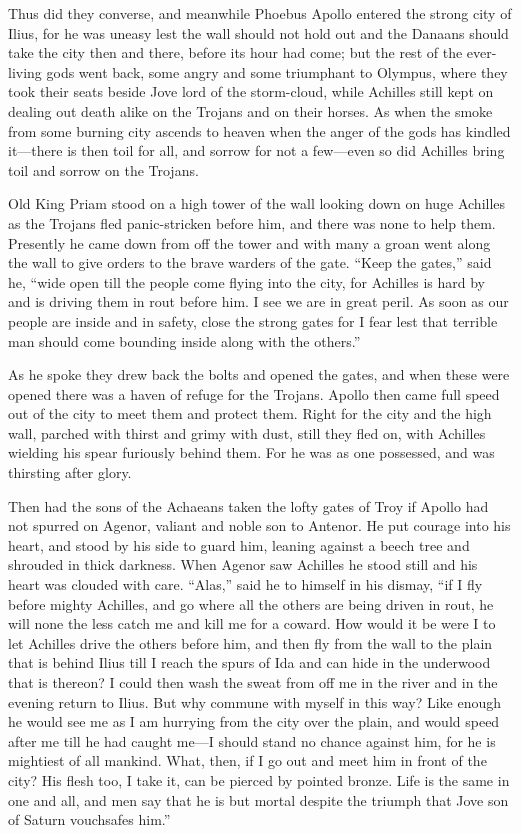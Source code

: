 Thus did they converse, and meanwhile Phoebus Apollo entered the strong
city of Ilius, for he was uneasy lest the wall should not hold out and the
Danaans should take the city then and there, before its hour had come; but
the rest of the ever-living gods went back, some angry and some triumphant
to Olympus, where they took their seats beside Jove lord of the storm-cloud,
while Achilles still kept on dealing out death alike on the Trojans
and on their horses. As when the smoke from some burning city ascends to
heaven when the anger of the gods has kindled it—there is then toil
for all, and sorrow for not a few—even so did Achilles bring toil
and sorrow on the Trojans.

Old King Priam stood on a high tower of the wall looking down on huge
Achilles as the Trojans fled panic-stricken before him, and there was none
to help them. Presently he came down from off the tower and with many a
groan went along the wall to give orders to the brave warders of the gate.
“Keep the gates,” said he, “wide open till the people come flying into the
city, for Achilles is hard by and is driving them in rout before him. I
see we are in great peril. As soon as our people are inside and in safety,
close the strong gates for I fear lest that terrible man should come
bounding inside along with the others.”

As he spoke they drew back the bolts and opened the gates, and when these
were opened there was a haven of refuge for the Trojans. Apollo then came
full speed out of the city to meet them and protect them. Right for the
city and the high wall, parched with thirst and grimy with dust, still
they fled on, with Achilles wielding his spear furiously behind them. For
he was as one possessed, and was thirsting after glory.

Then had the sons of the Achaeans taken the lofty gates of Troy if Apollo
had not spurred on Agenor, valiant and noble son to Antenor. He put
courage into his heart, and stood by his side to guard him, leaning
against a beech tree and shrouded in thick darkness. When Agenor saw
Achilles he stood still and his heart was clouded with care. “Alas,” said
he to himself in his dismay, “if I fly before mighty Achilles, and go
where all the others are being driven in rout, he will none the less catch
me and kill me for a coward. How would it be were I to let Achilles drive
the others before him, and then fly from the wall to the plain that is
behind Ilius till I reach the spurs of Ida and can hide in the underwood
that is thereon? I could then wash the sweat from off me in the river and
in the evening return to Ilius. But why commune with myself in this way?
Like enough he would see me as I am hurrying from the city over the plain,
and would speed after me till he had caught me—I should stand no
chance against him, for he is mightiest of all mankind. What, then, if I
go out and meet him in front of the city? His flesh too, I take it, can be
pierced by pointed bronze. Life is the same in one and all, and men say
that he is but mortal despite the triumph that Jove son of Saturn
vouchsafes him.”

